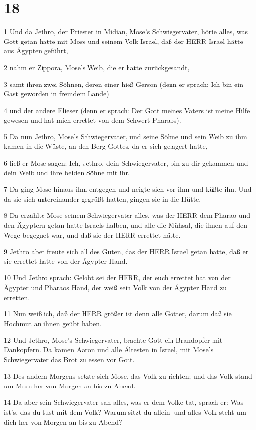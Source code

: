 \chapter{18}

\par 1 Und da Jethro, der Priester in Midian, Mose's Schwiegervater, hörte alles, was Gott getan hatte mit Mose und seinem Volk Israel, daß der HERR Israel hätte aus Ägypten geführt,
\par 2 nahm er Zippora, Mose's Weib, die er hatte zurückgesandt,
\par 3 samt ihren zwei Söhnen, deren einer hieß Gerson (denn er sprach: Ich bin ein Gast geworden in fremdem Lande)
\par 4 und der andere Elieser (denn er sprach: Der Gott meines Vaters ist meine Hilfe gewesen und hat mich errettet von dem Schwert Pharaos).
\par 5 Da nun Jethro, Mose's Schwiegervater, und seine Söhne und sein Weib zu ihm kamen in die Wüste, an den Berg Gottes, da er sich gelagert hatte,
\par 6 ließ er Mose sagen: Ich, Jethro, dein Schwiegervater, bin zu dir gekommen und dein Weib und ihre beiden Söhne mit ihr.
\par 7 Da ging Mose hinaus ihm entgegen und neigte sich vor ihm und küßte ihn. Und da sie sich untereinander gegrüßt hatten, gingen sie in die Hütte.
\par 8 Da erzählte Mose seinem Schwiegervater alles, was der HERR dem Pharao und den Ägyptern getan hatte Israels halben, und alle die Mühsal, die ihnen auf den Wege begegnet war, und daß sie der HERR errettet hätte.
\par 9 Jethro aber freute sich all des Guten, das der HERR Israel getan hatte, daß er sie errettet hatte von der Ägypter Hand.
\par 10 Und Jethro sprach: Gelobt sei der HERR, der euch errettet hat von der Ägypter und Pharaos Hand, der weiß sein Volk von der Ägypter Hand zu erretten.
\par 11 Nun weiß ich, daß der HERR größer ist denn alle Götter, darum daß sie Hochmut an ihnen geübt haben.
\par 12 Und Jethro, Mose's Schwiegervater, brachte Gott ein Brandopfer mit Dankopfern. Da kamen Aaron und alle Ältesten in Israel, mit Mose's Schwiegervater das Brot zu essen vor Gott.
\par 13 Des andern Morgens setzte sich Mose, das Volk zu richten; und das Volk stand um Mose her von Morgen an bis zu Abend.
\par 14 Da aber sein Schwiegervater sah alles, was er dem Volke tat, sprach er: Was ist's, das du tust mit dem Volk? Warum sitzt du allein, und alles Volk steht um dich her von Morgen an bis zu Abend?
